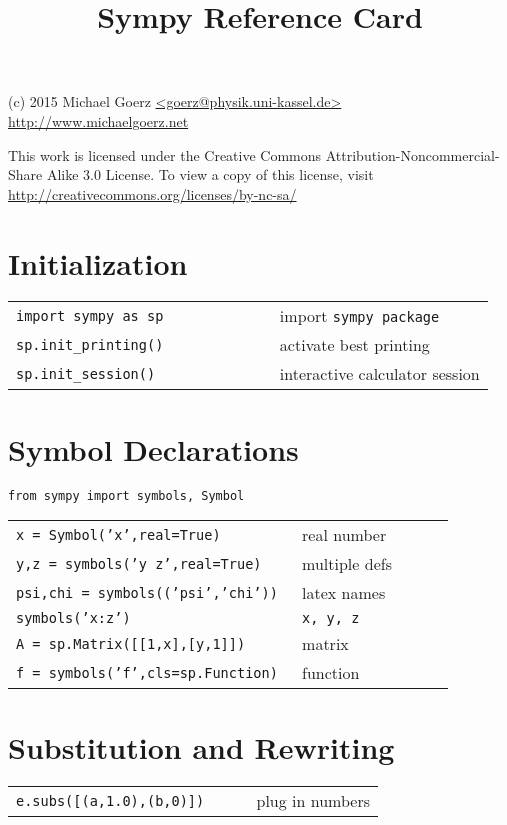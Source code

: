 \documentclass[8pt]{extarticle} %
\begin{document}
\raggedright

\begin{multicols}{3}

\title{Sympy Reference Card}

{\small
(c) 2015 Michael Goerz \url{<goerz@physik.uni-kassel.de>}\\
\url{http://www.michaelgoerz.net}

This work is licensed under the Creative Commons Attribution-Noncommercial-Share
Alike 3.0 License. To view a copy of this license, visit
\url{http://creativecommons.org/licenses/by-nc-sa/}
}

\vspace*{1pt}

\section{Initialization}

  \begin{tabular}{L{0.55\linewidth} L{0.45\linewidth}}
  {\tt import sympy as sp}  & import {\tt sympy package} \\
  {\tt sp.init\_printing()} & activate best printing \\
  {\tt sp.init\_session()} & interactive calculator session\\
  \end{tabular}

\section{Symbol Declarations}

  \vspace{1ex}
  {\tt from sympy import symbols, Symbol}
  \begin{tabular}{L{0.65\linewidth} L{0.35\linewidth}}
  \tt x~=~Symbol('x',real=True)                    & real number                  \\
  \tt y,z~=~symbols('y z',real=True)               & multiple defs                \\
  \tt psi,chi~=~symbols(('\bs{}psi','\bs{}chi'))   & latex names                  \\
  \tt symbols('x:z')                               & \tt x, y, z                  \\
  \tt A~=~sp.Matrix([[1,x],[y,1]])                 & matrix                       \\
  \tt f~=~symbols('f',cls=sp.Function)             & function                     \\
  \end{tabular}

\section{Substitution and Rewriting}

  \begin{tabular}{L{0.65\linewidth} L{0.35\linewidth}}
  \verb|e.subs([(a,1.0),(b,0)])|               & plug in numbers              \\
  \end{tabular}

\vfill
\clearpage %

\end{multicols}
\end{document}
